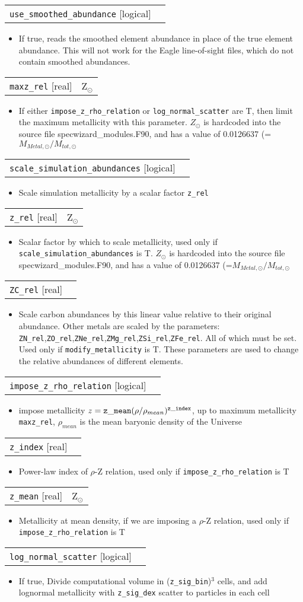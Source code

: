 \documentclass{report}
\makeatletter
\newcommand{\paramdefinition}[3]{
\begin{tabular*}{\textwidth}{l@{\extracolsep{\fill}}r}
		{\tt #1} [{\sc #2}]& #3 \\
\end{tabular*}}
\newcommand{\paramdescription}[1]{
\begin{itemize}
\item #1
\end{itemize}\vspace{0.2cm}}
\newcommand{\param}[1]{{\tt #1}}
\makeatother
\begin{document}
\paramdefinition{use\_smoothed\_abundance}{logical}{}
\paramdescription{If true, reads the smoothed element abundance in place of the true element abundance. This will not work for the Eagle line-of-sight files, which do not contain smoothed abundances.}

\paramdefinition{maxz\_rel}{real}{Z$_{\odot}$}
\paramdescription{If either {\tt impose\_z\_rho\_relation} or {\tt log\_normal\_scatter} are T, then limit the maximum metallicity with this parameter.  $Z_{\odot}$ is hardcoded into the source file specwizard\_modules.F90, and has a value of 0.0126637  (=$M_{Metal,\odot}/M_{tot,\odot}$}

\paramdefinition{scale\_simulation\_abundances}{logical}{ }
\paramdescription{Scale simulation metallicity by a scalar factor \param{z\_rel}}

\paramdefinition{z\_rel}{real}{Z$_{\odot}$}
\paramdescription{Scalar factor by which to scale metallicity, used only if {\tt scale\_simulation\_abundances} is T.   $Z_{\odot}$ is hardcoded into the source file specwizard\_modules.F90, and has a value of 0.0126637  (=$M_{Metal,\odot}/M_{tot,\odot}$}

\paramdefinition{ZC\_rel}{real}{}
\paramdescription{Scale carbon abundances by this linear value relative to their original abundance.  Other metals are scaled by the parameters: {\tt ZN\_rel},{\tt ZO\_rel},{\tt ZNe\_rel},{\tt ZMg\_rel},{\tt ZSi\_rel},{\tt ZFe\_rel}.  All of which must be set.  Used only if {\tt modify\_metallicity} is T.  These parameters are used to change the relative abundances of different elements.}

\paramdefinition{impose\_z\_rho\_relation}{logical}{ }
\paramdescription{ impose metallicity $z = {\tt z\_mean} (\rho/\rho_{mean})^{{\tt z\_index}}$, up to maximum metallicity {\tt maxz\_rel}, $\rho_{mean}$ is the mean baryonic density of the Universe}

\paramdefinition{z\_index}{real}{ }
\paramdescription{Power-law index of $\rho$-Z relation, used only if {\tt impose\_z\_rho\_relation} is T}

\paramdefinition{z\_mean}{real}{Z$_{\odot}$}
\paramdescription{Metallicity at mean density, if we are imposing a $\rho$-Z relation, used only if {\tt impose\_z\_rho\_relation} is T}

\paramdefinition{log\_normal\_scatter}{logical}{ }
\paramdescription{If true, Divide computational volume in ({\tt z\_sig\_bin})$^3$ cells, and add lognormal metallicity with {\tt z\_sig\_dex} scatter to particles in each cell}
\end{document}
